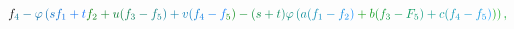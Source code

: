 \documentclass[12pt]{article}
\begin{document}
\begin{displaymath}
{f} _ { \mathcolor[RGB]{0,105,135}{4} } \mathcolor[RGB]{0,105,150}{-} \mathcolor[RGB]{0,105,165}{\varphi} \mathcolor[RGB]{0,105,180}{\left(} \mathcolor[RGB]{0,105,195}{s} \mathcolor[RGB]{0,105,210}{f} _ { \mathcolor[RGB]{0,105,225}{1} } \mathcolor[RGB]{0,105,240}{+} \mathcolor[RGB]{0,105,255}{t} \mathcolor[RGB]{0,120,0}{f} _ { \mathcolor[RGB]{0,120,15}{2} } \mathcolor[RGB]{0,120,30}{+} \mathcolor[RGB]{0,120,45}{u} \mathcolor[RGB]{0,120,60}{(} \mathcolor[RGB]{0,120,75}{f} _ { \mathcolor[RGB]{0,120,90}{3} } \mathcolor[RGB]{0,120,105}{-} \mathcolor[RGB]{0,120,120}{f} _ { \mathcolor[RGB]{0,120,135}{5} } \mathcolor[RGB]{0,120,150}{)} \mathcolor[RGB]{0,120,165}{+} \mathcolor[RGB]{0,120,180}{v} \mathcolor[RGB]{0,120,195}{(} \mathcolor[RGB]{0,120,210}{f} _ { \mathcolor[RGB]{0,120,225}{4} } \mathcolor[RGB]{0,120,240}{-} \mathcolor[RGB]{0,120,255}{f} _ { \mathcolor[RGB]{0,135,0}{5} } \mathcolor[RGB]{0,135,15}{)} \mathcolor[RGB]{0,135,30}{-} \mathcolor[RGB]{0,135,45}{(} \mathcolor[RGB]{0,135,60}{s} \mathcolor[RGB]{0,135,75}{+} \mathcolor[RGB]{0,135,90}{t} \mathcolor[RGB]{0,135,105}{)} \mathcolor[RGB]{0,135,120}{\varphi} \mathcolor[RGB]{0,135,135}{\left(} \mathcolor[RGB]{0,135,150}{a} \mathcolor[RGB]{0,135,165}{(} \mathcolor[RGB]{0,135,180}{f} _ { \mathcolor[RGB]{0,135,195}{1} } \mathcolor[RGB]{0,135,210}{-} \mathcolor[RGB]{0,135,225}{f} _ { \mathcolor[RGB]{0,135,240}{2} } \mathcolor[RGB]{0,135,255}{)} \mathcolor[RGB]{0,150,0}{+} \mathcolor[RGB]{0,150,15}{b} \mathcolor[RGB]{0,150,30}{(} \mathcolor[RGB]{0,150,45}{f} _ { \mathcolor[RGB]{0,150,60}{3} } \mathcolor[RGB]{0,150,75}{-} \mathcolor[RGB]{0,150,90}{F} _ { \mathcolor[RGB]{0,150,105}{5} } \mathcolor[RGB]{0,150,120}{)} \mathcolor[RGB]{0,150,135}{+} \mathcolor[RGB]{0,150,150}{c} \mathcolor[RGB]{0,150,165}{(} \mathcolor[RGB]{0,150,180}{f} _ { \mathcolor[RGB]{0,150,195}{4} } \mathcolor[RGB]{0,150,210}{-} \mathcolor[RGB]{0,150,225}{f} _ { \mathcolor[RGB]{0,150,240}{5} } \mathcolor[RGB]{0,150,255}{)} \mathcolor[RGB]{0,165,0}{\right)} \mathcolor[RGB]{0,165,15}{\right)} \mathcolor[RGB]{0,165,30}{,} \mathcolor[RGB]{0,165,45}{\,
}
\end{displaymath}
\end{document}
